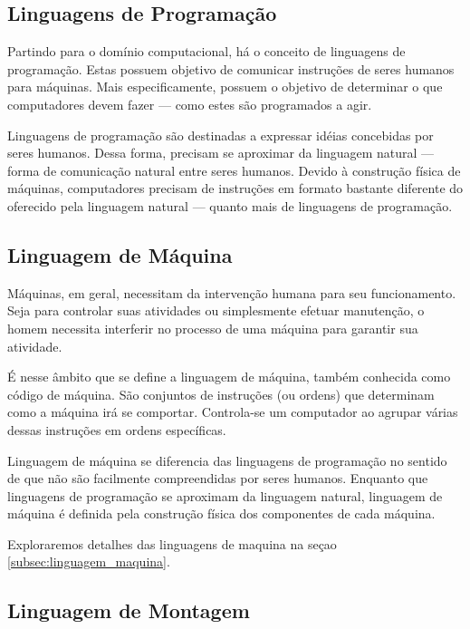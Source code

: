 \subsection{Linguagens de Programação}

Partindo para o domínio computacional, há o conceito de linguagens de
programação. Estas possuem objetivo de comunicar instruções de seres humanos
para máquinas. Mais especificamente, possuem o objetivo de determinar o que
computadores devem fazer --- como estes são programados a agir.

Linguagens de programação são destinadas a expressar idéias concebidas por seres
humanos. Dessa forma, precisam se aproximar da linguagem natural --- forma de
comunicação natural entre seres humanos.  Devido à construção física de
máquinas, computadores precisam de instruções em formato bastante diferente do
oferecido pela linguagem natural --- quanto mais de linguagens de programação.

\subsection{Linguagem de Máquina}

Máquinas, em geral, necessitam da intervenção humana para seu
funcionamento. Seja para controlar suas atividades ou simplesmente efetuar
manutenção, o homem necessita interferir no processo de uma máquina para
garantir sua atividade.

É nesse âmbito que se define a linguagem de máquina, também conhecida como
código de máquina. São conjuntos de instruções (ou ordens) que determinam como a
máquina irá se comportar. Controla-se um computador ao agrupar várias dessas
instruções em ordens específicas.

Linguagem de máquina se diferencia das linguagens de programação no sentido de
que não são facilmente compreendidas por seres humanos. Enquanto que linguagens
de programação se aproximam da linguagem natural, linguagem de máquina é
definida pela construção física dos componentes de cada máquina.


Exploraremos detalhes das linguagens de maquina na seçao
\ref{subsec:linguagem_maquina}.

\subsection{Linguagem de Montagem}


